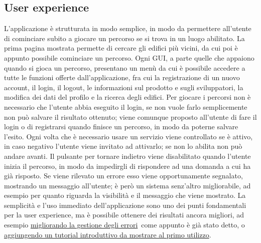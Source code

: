 	\subsection{User experience}
		L'applicazione è strutturata in modo semplice, in modo da permettere all'utente di cominciare subito a giocare un percorso se si trova in un luogo abilitato. La prima pagina mostrata permette di cercare gli edifici più vicini, da cui poi è appunto possibile cominciare un percorso. Ogni GUI, a parte quelle che appaiono quando si gioca un percorso, presentano un menù da cui è possibile accedere a tutte le funzioni offerte dall'applicazione, fra cui la registrazione di un nuovo account, il login, il logout, le informazioni sul prodotto e sugli sviluppatori, la modifica dei dati del profilo e la ricerca degli edifici.
		Per giocare i percorsi non è necessario che l'utente abbia eseguito il login, se non vuole farlo semplicemente non può salvare il risultato ottenuto; viene comunque proposto all'utente di fare il login o di registrarsi quando finisce un percorso, in modo da poterne salvare l'esito. 
		Ogni volta che è necessario usare un servizio viene controllato se è attivo, in caso negativo l'utente viene invitato ad attivarlo; se non lo abilita non può andare avanti.
		Il pulsante per tornare indietro viene disabilitato quando l'utente inizia il percorso, in modo da impedirgli di rispondere ad una domanda a cui ha già risposto.
		Se viene rilevato un errore esso viene opportunamente segnalato, mostrando un messaggio all'utente; è però un sistema senz'altro migliorabile, ad esempio per quanto riguarda la visibilità e il messaggio che viene mostrato.
		La semplicità e l'uso immediato dell'applicazione sono uno dei punti fondamentali per la user experience, ma è possibile ottenere dei risultati ancora migliori, ad esempio \hyperref[sec:gestione_errori]{migliorando la gestione degli errori}\, come appunto è già stato detto, o \hyperref[sec:tutorial]{aggiungendo un tutorial introduttivo da mostrare al primo utilizzo}.
